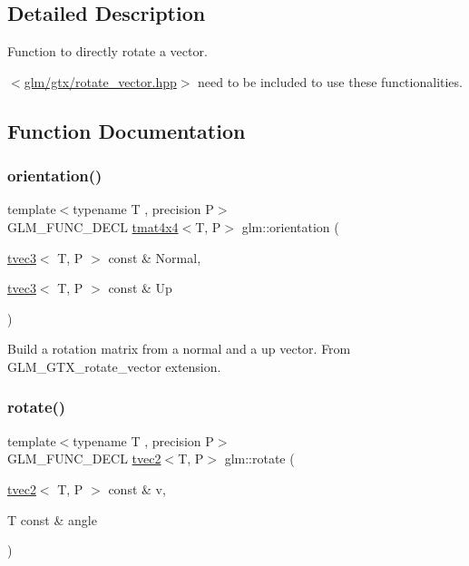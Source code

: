 \subsection{Detailed Description}
Function to directly rotate a vector. 

$<$\hyperlink{rotate__vector_8hpp}{glm/gtx/rotate\+\_\+vector.\+hpp}$>$ need to be included to use these functionalities. 

\subsection{Function Documentation}
\mbox{\label{group__gtx__rotate__vector_ga49b4d082305cdfcfe0a5c184f684a902}} 
\subsubsection{\texorpdfstring{orientation()}{orientation()}}
{\footnotesize\ttfamily template$<$typename T , precision P$>$ \\
G\+L\+M\+\_\+\+F\+U\+N\+C\+\_\+\+D\+E\+CL \hyperlink{structglm_1_1tmat4x4}{tmat4x4}$<$T, P$>$ glm\+::orientation (\begin{DoxyParamCaption}\item[{\hyperlink{structglm_1_1tvec3}{tvec3}$<$ T, P $>$ const \&}]{Normal,  }\item[{\hyperlink{structglm_1_1tvec3}{tvec3}$<$ T, P $>$ const \&}]{Up }\end{DoxyParamCaption})}

Build a rotation matrix from a normal and a up vector. From G\+L\+M\+\_\+\+G\+T\+X\+\_\+rotate\+\_\+vector extension. \mbox{\label{group__gtx__rotate__vector_ga9bff444fb191e2e089a906b899cd033d}} 
\subsubsection{\texorpdfstring{rotate()}{rotate()}\hspace{0.1cm}{\footnotesize\ttfamily [1/3]}}
{\footnotesize\ttfamily template$<$typename T , precision P$>$ \\
G\+L\+M\+\_\+\+F\+U\+N\+C\+\_\+\+D\+E\+CL \hyperlink{structglm_1_1tvec2}{tvec2}$<$T, P$>$ glm\+::rotate (\begin{DoxyParamCaption}\item[{\hyperlink{structglm_1_1tvec2}{tvec2}$<$ T, P $>$ const \&}]{v,  }\item[{T const \&}]{angle }\end{DoxyParamCaption})}

